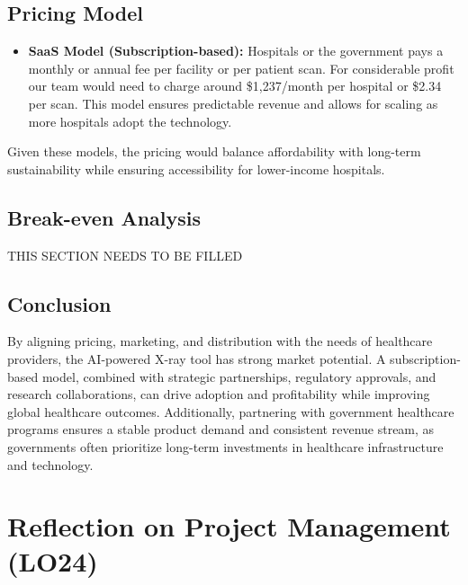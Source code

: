 \documentclass{article}
\begin{document}
\subsection{Pricing Model}
\begin{itemize}
    \item \textbf{SaaS Model (Subscription-based):} Hospitals or the government pays a monthly or annual fee per facility or per patient scan. For considerable profit our team would need to charge around \$1,237/month per hospital or \$2.34 per scan. This model ensures predictable revenue and allows for scaling as more hospitals adopt the technology.
\end{itemize}
Given these models, the pricing would balance affordability with long-term sustainability while ensuring accessibility for lower-income hospitals.

\subsection{Break-even Analysis}
THIS SECTION NEEDS TO BE FILLED

\subsection{Conclusion}
By aligning pricing, marketing, and distribution with the needs of healthcare providers, the AI-powered X-ray tool has strong market potential. A subscription-based model, combined with strategic partnerships, regulatory approvals, and research collaborations, can drive adoption and profitability while improving global healthcare outcomes. Additionally, partnering with government healthcare programs ensures a stable product demand and consistent revenue stream, as governments often prioritize long-term investments in healthcare infrastructure and technology.

\section{Reflection on Project Management (LO24)}
\end{document}

